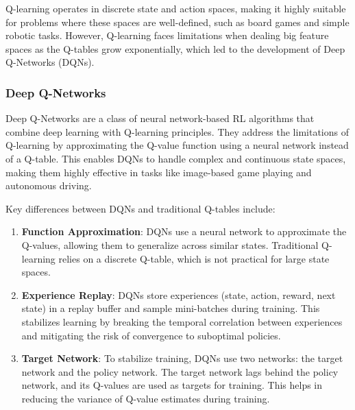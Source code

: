 Q-learning operates in discrete state and action spaces, making it highly suitable for problems where these spaces are well-defined, such as board games and simple robotic tasks. However, Q-learning faces limitations when dealing big feature spaces as the Q-tables grow exponentially, which led to the development of Deep Q-Networks (DQNs).

\subsubsection{Deep Q-Networks}

Deep Q-Networks are a class of neural network-based RL algorithms that combine deep learning with Q-learning principles. They address the limitations of Q-learning by approximating the Q-value function using a neural network instead of a Q-table. This enables DQNs to handle complex and continuous state spaces, making them highly effective in tasks like image-based game playing and autonomous driving. \cite{dqntut}

Key differences between DQNs and traditional Q-tables include:

\begin{enumerate}
	\item \textbf{Function Approximation}: DQNs use a neural network to approximate the Q-values, allowing them to generalize across similar states. Traditional Q-learning relies on a discrete Q-table, which is not practical for large state spaces.
	
	\item \textbf{Experience Replay}: DQNs store experiences (state, action, reward, next state) in a replay buffer and sample mini-batches during training. This stabilizes learning by breaking the temporal correlation between experiences and mitigating the risk of convergence to suboptimal policies.
	
	\item \textbf{Target Network}: To stabilize training, DQNs use two networks: the target network and the policy network. The target network lags behind the policy network, and its Q-values are used as targets for training. This helps in reducing the variance of Q-value estimates during training.
\end{enumerate}


